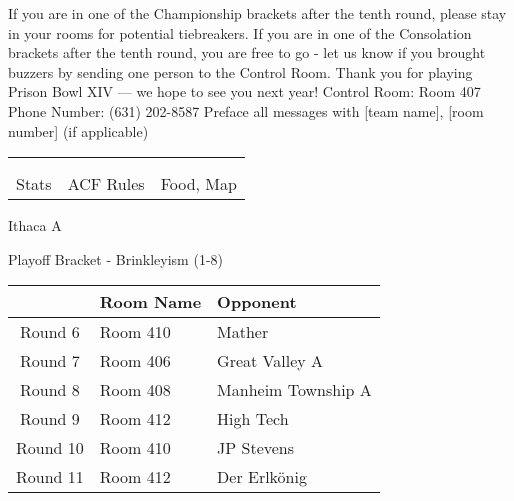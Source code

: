 \documentclass{article}%
\begin{document}
\vspace*{30pt}%
\linebreak%
If you are in one of the Championship brackets after the tenth round, please stay in your rooms for potential tiebreakers.\newline%
\newline%
If you are in one of the Consolation brackets after the tenth round, you are free to go {-} let us know if you brought buzzers by sending one person to the Control Room.\newline%
\newline%
Thank you for playing Prison Bowl XIV — we hope to see you next year!\newline%
\newline%
Control Room: Room 407\newline%
Phone Number: (631) 202{-}8587\newline%
Preface all messages with {[}team name{]}, {[}room number{]} (if applicable)%
\vspace*{30pt}%
\newline%
%
\begin{tabularx}{\textwidth}{YYY}%
  &  &  \\%
\\%
Stats&ACF Rules&Food, Map\\%
\end{tabularx}%
\newpage%
\begin{center}%
\begin{Huge}%
Ithaca A%
\end{Huge}%
\vspace*{12pt}%
\linebreak%
\begin{Large}%
Playoff Bracket {-} Brinkleyism (1{-}8)%
\end{Large}%
\end{center}%
\vspace*{4pt}%
%
\begin{tabularx}{\textwidth}{|c|Y|Y|}%
\hline%
&Room Name&Opponent\\%
\hline%
Round 6&Room 410&Mather\\%
Round 7&Room 406&Great Valley A\\%
Round 8&Room 408&Manheim Township A\\%
Round 9&Room 412&High Tech\\%
Round 10&Room 410&JP Stevens\\%
Round 11&Room 412&Der Erlkönig\\%
\hline%
\end{tabularx}%
\end{document}
